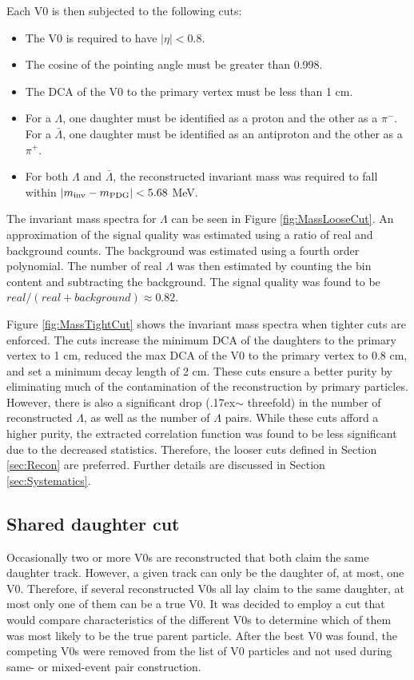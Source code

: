 Each V0 is then subjected to the following cuts:
\begin{itemize}
\item The V0 is required to have $|\eta| < 0.8$.
\item The cosine of the pointing angle must be greater than 0.998.
\item The DCA of the V0 to the primary vertex must be less than 1 cm.
\item For a $\Lambda$, one daughter must be identified as a proton and the other as a $\pi^-$.  For a $\bar{\Lambda}$, one daughter must be identified as an antiproton and the other as a $\pi^+$.
\item For both $\Lambda$ and $\bar{\Lambda}$, the reconstructed invariant mass was required to fall within $\left\lvert m_\mathrm{inv}-m_\mathrm{PDG}\right\rvert < 5.68$ MeV.
\end{itemize}

The invariant mass spectra for $\Lambda$ can be seen in Figure \ref{fig:MassLooseCut}. An approximation of the signal quality was estimated using a ratio of real and background counts.  The background was estimated using a fourth order polynomial.  The number of real $\Lambda$ was then estimated by counting the bin content and subtracting the background. The signal quality was found to be $real/(real + background) \approx 0.82$.

Figure \ref{fig:MassTightCut} shows the invariant mass spectra when tighter cuts are enforced.  The cuts increase the minimum DCA of the daughters to the primary vertex to 1 cm, reduced the max DCA of the V0 to the primary vertex to 0.8 cm, and set a minimum decay length of 2 cm.  These cuts ensure a better purity by eliminating much of the contamination of the reconstruction by primary particles.  However, there is also a significant drop ({\raise.17ex\hbox{$\scriptstyle\mathtt{\sim}$}} threefold) in the number of reconstructed $\Lambda$, as well as the number of $\Lambda$ pairs.  While these cuts afford a higher purity, the extracted correlation function was found to be less significant due to the decreased statistics.  Therefore, the looser cuts defined in Section \ref{sec:Recon} are preferred.  Further details are discussed in Section \ref{sec:Systematics}.

\subsection{Shared daughter cut}

Occasionally two or more V0s are reconstructed that both claim the same daughter track.  However, a given track can only be the daughter of, at most, one V0.  Therefore, if several reconstructed V0s all lay claim to the same daughter, at most only one of them can be a true V0.  It was decided to employ a cut that would compare characteristics of the different V0s to determine which of them was most likely to be the true parent particle.  After the best V0 was found, the competing V0s were removed from the list of V0 particles and not used during same- or mixed-event pair construction.


